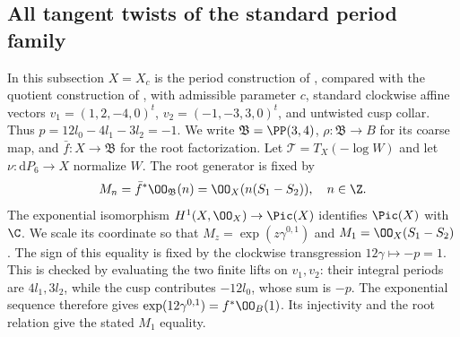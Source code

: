 \subsection{All tangent twists of the standard period family}

In this subsection $X=X_c$ is the period construction of \cite{AC26}, compared with the quotient construction of \cite{Engel2026}, with admissible parameter $c$, standard clockwise affine vectors
$v_1=(1,2,-4,0)^t$, $v_2=(-1,-3,3,0)^t$, and untwisted cusp collar. Thus $p=12l_0-4l_1-3l_2=-1$. We write $\mathfrak B=\PP(3,4)$, $\rho:\mathfrak B\to B$ for its coarse map, and $\bar f:X\to\mathfrak B$ for the root factorization. Let $\mathcal T=T_X(-\log W)$ and let $\nu:\mathrm dP_6\to X$ normalize $W$. The root generator is fixed by
\[
 M_n=\bar f^*\OO_{\mathfrak B}(n)
     =\OO_X(n(S_1-S_2)),\quad n\in\Z.
\]
The exponential isomorphism $H^1(X,\OO_X)\to\Pic(X)$ identifies $\Pic(X)$ with $\C$. We scale its coordinate so that $M_z=\exp(z\gamma^{0,1})$ and $M_1=\OO_X(S_1-S_2)$. The sign of this equality is fixed by the clockwise transgression $12\gamma\mapsto-p=1$. This is checked by evaluating the two finite lifts on $v_1,v_2$: their integral periods are $4l_1,3l_2$, while the cusp contributes $-12l_0$, whose sum is $-p$. The exponential sequence therefore gives $\exp(12\gamma^{0,1})=f^*\OO_B(1)$. Its injectivity and the root relation give the stated $M_1$ equality.

